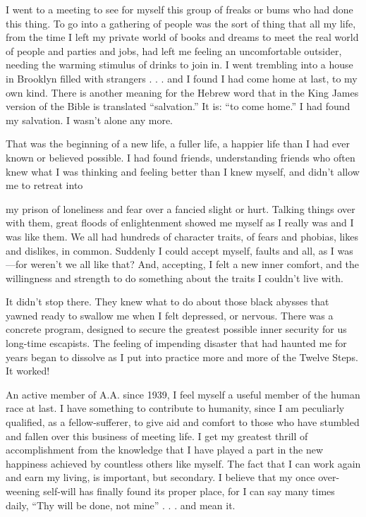 \begin{biblechapter}
I went to a meeting to see for myself this group of freaks or bums who had done this thing. To go into a gathering of people was the sort of thing that all my life, from the time I left my private world of books and dreams to meet the real world of people and parties and jobs, had left me feeling an uncomfortable outsider, needing the warming stimulus of drinks to join in. I went trembling into a house in Brooklyn filled with strangers . . . and I found I had come home at last, to my own kind. There is another meaning for the Hebrew word that in the King James version of the Bible is translated “salvation.” It is: “to come home.” I had found my salvation. I wasn’t alone any more.

That was the beginning of a new life, a fuller life, a happier life than I had ever known or believed possible. I had found friends, understanding friends who often knew what I was thinking and feeling better than I knew myself, and didn’t allow me to retreat into

my prison of loneliness and fear over a fancied slight or hurt. Talking things over with them, great floods of enlightenment showed me myself as I really was and I was like them. We all had hundreds of character traits, of fears and phobias, likes and dislikes, in common. Suddenly I could accept myself, faults and all, as I was—for weren’t we all like that? And, accepting, I felt a new inner comfort, and the willingness and strength to do something about the traits I couldn’t live with.

It didn’t stop there. They knew what to do about those black abysses that yawned ready to swallow me when I felt depressed, or nervous. There was a concrete program, designed to secure the greatest possible inner security for us long-time escapists. The feeling of impending disaster that had haunted me for years began to dissolve as I put into practice more and more of the Twelve Steps. It worked!

An active member of A.A. since 1939, I feel myself a useful member of the human race at last. I have something to contribute to humanity, since I am peculiarly qualified, as a fellow-sufferer, to give aid and comfort to those who have stumbled and fallen over this business of meeting life. I get my greatest thrill of accomplishment from the knowledge that I have played a part in the new happiness achieved by countless others like myself. The fact that I can work again and earn my living, is important, but secondary. I believe that my once over-weening self-will has finally found its proper place, for I can say many times daily, “Thy will be done, not mine” . . . and mean it.

\end{biblechapter}

